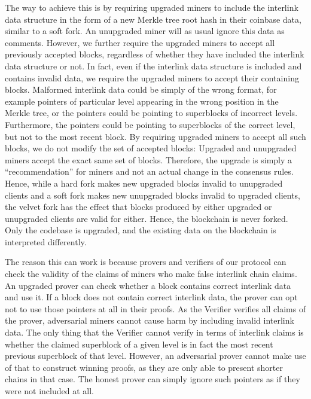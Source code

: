 The way to achieve this is by requiring upgraded miners to include the
interlink data structure in the form of a new Merkle tree root hash in their
coinbase data, similar to a soft fork. An unupgraded miner will as usual ignore
this data as comments. However, we further require the upgraded miners to
accept all previously accepted blocks, regardless of whether they have included
the interlink data structure or not. In fact, even if the interlink data
structure is included and contains invalid data, we require the upgraded miners
to accept their containing blocks. Malformed interlink data could be simply of
the wrong format, for example pointers of particular level appearing in the wrong
position in the Merkle tree, or the pointers could be pointing to superblocks
of incorrect levels.  Furthermore, the pointers could be pointing to
superblocks of the correct level, but not to the most recent block. By
requiring upgraded miners to accept all such blocks, we do not modify the set
of accepted blocks: Upgraded and unupgraded miners accept the exact same set of
blocks. Therefore, the upgrade is simply a ``recommendation'' for miners and
not an actual change in the consensus rules. Hence, while a hard fork makes new
upgraded blocks invalid to unupgraded clients and a soft fork makes new
unupgraded blocks invalid to upgraded clients, the velvet fork has the effect
that blocks produced by either upgraded or unupgraded clients are valid for
either. Hence, the blockchain is never forked. Only the codebase is upgraded,
and the existing data on the blockchain is interpreted differently.

The reason this can work is because provers and verifiers of our protocol can
check the validity of the claims of miners who make false interlink chain
claims. An upgraded prover can check whether a block contains correct interlink
data and use it. If a block does not contain correct interlink data, the prover
can opt not to use those pointers at all in their proofs. As the Verifier
verifies all claims of the prover, adversarial miners cannot cause harm by
including invalid interlink data. The only thing that the Verifier cannot
verify in terms of interlink claims is whether the claimed superblock of a
given level is in fact the most recent previous superblock of that level.
However, an adversarial prover cannot make use of that to construct winning
proofs, as they are only able to present shorter chains in that case. The
honest prover can simply ignore such pointers as if they were not included at
all.

